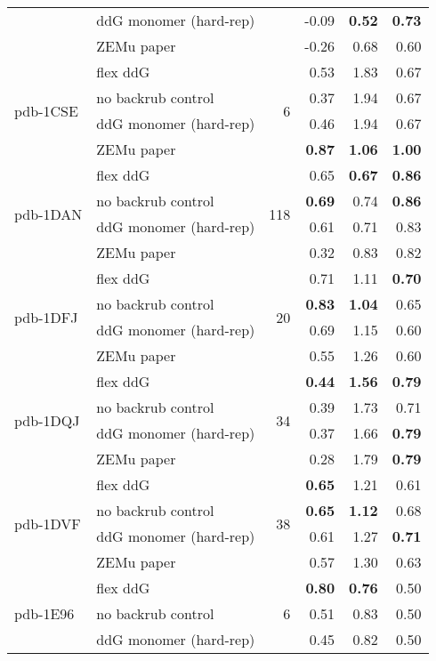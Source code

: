 \begin{table}
\begin{tabular}{llrrrr}
 & ddG monomer (hard-rep) & & -0.09 & \textbf{0.52} & \textbf{0.73}  \\
 & ZEMu paper & & -0.26 & 0.68 & 0.60  \\
\hline
 \multirow{ 4}{*}{pdb-1CSE} & flex ddG & \multirow{ 4}{*}{6} & 0.53 & 1.83 & 0.67  \\
 & no backrub control & & 0.37 & 1.94 & 0.67  \\
 & ddG monomer (hard-rep) & & 0.46 & 1.94 & 0.67  \\
 & ZEMu paper & & \textbf{0.87} & \textbf{1.06} & \textbf{1.00}  \\
\hline
 \multirow{ 4}{*}{pdb-1DAN} & flex ddG & \multirow{ 4}{*}{118} & 0.65 & \textbf{0.67} & \textbf{0.86}  \\
 & no backrub control & & \textbf{0.69} & 0.74 & \textbf{0.86}  \\
 & ddG monomer (hard-rep) & & 0.61 & 0.71 & 0.83  \\
 & ZEMu paper & & 0.32 & 0.83 & 0.82  \\
\hline
 \multirow{ 4}{*}{pdb-1DFJ} & flex ddG & \multirow{ 4}{*}{20} & 0.71 & 1.11 & \textbf{0.70}  \\
 & no backrub control & & \textbf{0.83} & \textbf{1.04} & 0.65  \\
 & ddG monomer (hard-rep) & & 0.69 & 1.15 & 0.60  \\
 & ZEMu paper & & 0.55 & 1.26 & 0.60  \\
\hline
 \multirow{ 4}{*}{pdb-1DQJ} & flex ddG & \multirow{ 4}{*}{34} & \textbf{0.44} & \textbf{1.56} & \textbf{0.79}  \\
 & no backrub control & & 0.39 & 1.73 & 0.71  \\
 & ddG monomer (hard-rep) & & 0.37 & 1.66 & \textbf{0.79}  \\
 & ZEMu paper & & 0.28 & 1.79 & \textbf{0.79}  \\
\hline
 \multirow{ 4}{*}{pdb-1DVF} & flex ddG & \multirow{ 4}{*}{38} & \textbf{0.65} & 1.21 & 0.61  \\
 & no backrub control & & \textbf{0.65} & \textbf{1.12} & 0.68  \\
 & ddG monomer (hard-rep) & & 0.61 & 1.27 & \textbf{0.71}  \\
 & ZEMu paper & & 0.57 & 1.30 & 0.63  \\
\hline
 \multirow{ 4}{*}{pdb-1E96} & flex ddG & \multirow{ 4}{*}{6} & \textbf{0.80} & \textbf{0.76} & 0.50  \\
 & no backrub control & & 0.51 & 0.83 & 0.50  \\
 & ddG monomer (hard-rep) & & 0.45 & 0.82 & 0.50  \\

\end{tabular}
\end{table}
